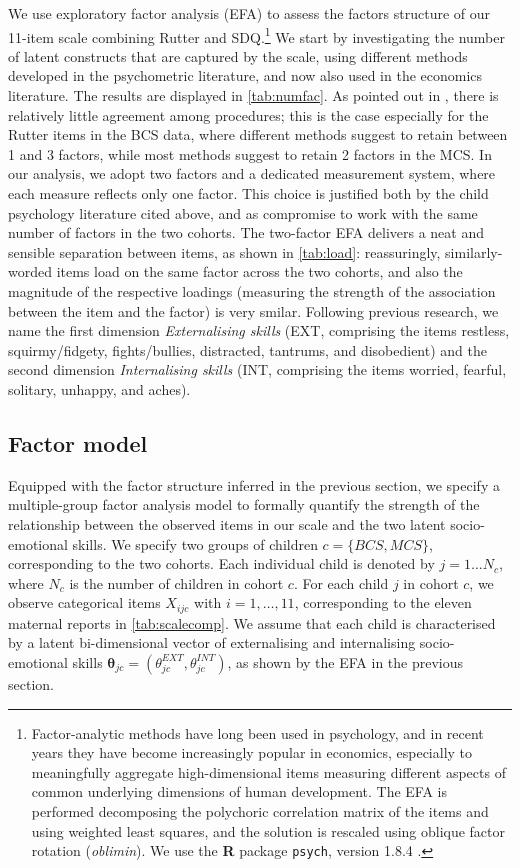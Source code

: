 We use exploratory factor analysis (EFA) to assess the factors structure of our 11-item scale combining Rutter and SDQ.\footnote{Factor-analytic methods have long been used in psychology, and in recent years they have become increasingly popular in economics, especially to meaningfully aggregate high-dimensional items measuring different aspects of common underlying dimensions of human development. The EFA is performed decomposing the polychoric correlation matrix of the items and using weighted least squares, and the solution is rescaled using oblique factor rotation (\emph{oblimin}). We use the \textbf{\textsf{R}} package \texttt{psych}, version 1.8.4 \citep{Revelle2018}.} We start by investigating the number of latent constructs that are captured by the scale, using different methods developed in the psychometric literature, and now also used in the economics literature. The results are displayed in \autoref{tab:numfac}. As pointed out in \citet{Conti2014}, there is relatively little agreement among procedures; this is the case especially for the Rutter items in the BCS data, where different methods suggest to retain between 1 and 3 factors, while most methods suggest to retain 2 factors in the MCS. In our analysis, we adopt two factors and a dedicated measurement system, where each measure reflects only one factor. This choice is justified both by the child psychology literature cited above, and as compromise to work with the same number of factors in the two cohorts. The two-factor EFA delivers a neat and sensible separation between items, as shown in \autoref{tab:load}: reassuringly, similarly-worded items load on the same factor across the two cohorts, and also the magnitude of the respective loadings (measuring the strength of the association between the item and the factor) is very smilar. Following previous research, we name the first dimension \emph{Externalising skills} (EXT, comprising the items restless, squirmy/fidgety, fights/bullies, distracted, tantrums, and disobedient) and the second dimension \emph{Internalising skills} (INT, comprising the items worried, fearful, solitary, unhappy, and aches).

\subsection{Factor model \label{sec:fm}}

Equipped with the factor structure inferred in the previous section, we specify a multiple-group factor analysis model to formally quantify the strength of the relationship between the observed items in our scale and the two latent socio-emotional skills. We specify two groups of children $c=\{BCS,MCS\}$, corresponding to the two cohorts. Each individual child is denoted by $j=1\dots N_c$, where $N_c$ is the number of children in cohort $c$. For each child $j$ in cohort $c$, we observe categorical items $X_{ijc}$ with $i=1,\dots,11$, corresponding to the eleven maternal reports in \autoref{tab:scalecomp}. We assume that each child is characterised by a latent bi-dimensional vector of externalising and internalising socio-emotional skills $\bm{\theta}_{jc} = (\theta_{jc}^{EXT},\theta_{jc}^{INT})$, as shown by the EFA in the previous section.

